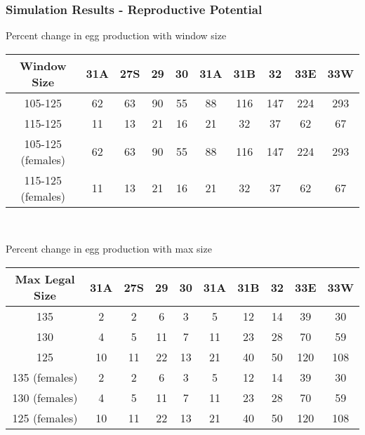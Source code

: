 \documentclass{beamer}
\begin{document}
\begin{frame}
\frametitle{Simulation Results - Reproductive Potential}
Percent change in egg production with window size 
\centering
\begin{tabular}{|c|c|c|c|c|c|c|c|c|c|}
\hline
Window Size       & 31A & 27S & 29 & 30 & 31A & 31B & 32 & 33E & 33W \\
\hline
105-125           & 62 & 63 & 90 & 55 & 88 & 116 & 147 & 224 & 293 \\
\hline
115-125           & 11 & 13 & 21 & 16 & 21 & 32 & 37 & 62 & 67 \\
\hline
105-125 (females) & 62 & 63 & 90 & 55 & 88 & 116 & 147 & 224 & 293 \\
\hline
115-125 (females) & 11 & 13 & 21 & 16 & 21 & 32 & 37 & 62 & 67 \\
\hline
 
\end{tabular}\\

\vspace{5mm}

Percent change in egg production with max size 
\centering
\begin{tabular}{|c|c|c|c|c|c|c|c|c|c|}
\hline
Max Legal Size & 31A & 27S & 29 & 30 & 31A & 31B & 32 & 33E & 33W \\
\hline
135            & 2 & 2 & 6 & 3 & 5 & 12 & 14 & 39 & 30 \\
\hline
130            & 4 & 5 & 11 & 7 & 11 & 23 & 28 & 70 & 59 \\
\hline
125            & 10 & 11 & 22 & 13 & 21 & 40 & 50 & 120 & 108 \\
\hline
135 (females)   & 2 & 2 & 6 & 3 & 5 & 12 & 14 & 39 & 30 \\
\hline
130 (females)   & 4 & 5 & 11 & 7 & 11 & 23 & 28 & 70 & 59 \\
\hline
125 (females)   & 10 & 11 & 22 & 13 & 21 & 40 & 50 & 120 & 108 \\
\hline
 
\end{tabular}
\end{frame}
\end{document}
